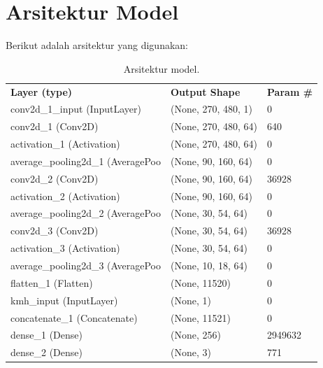 \section{Arsitektur Model}
\label{sec:arsitektur_model}

Berikut adalah arsitektur yang digunakan:

\begin{table}[H]
	\begin{tabular}{lll}
		\textbf{Layer (type)}                      & \textbf{Output Shape}         & \textbf{Param \#} \\
		conv2d\_1\_input (InputLayer)     & (None, 270, 480, 1)  & 0        \\
		conv2d\_1 (Conv2D)                & (None, 270, 480, 64) & 640      \\
		activation\_1 (Activation)        & (None, 270, 480, 64) & 0        \\
		average\_pooling2d\_1 (AveragePoo & (None, 90, 160, 64)  & 0        \\
		conv2d\_2 (Conv2D)                & (None, 90, 160, 64)  & 36928    \\
		activation\_2 (Activation)        & (None, 90, 160, 64)  & 0        \\
		average\_pooling2d\_2 (AveragePoo & (None, 30, 54, 64)   & 0        \\
		conv2d\_3 (Conv2D)                & (None, 30, 54, 64)   & 36928    \\
		activation\_3 (Activation)        & (None, 30, 54, 64)   & 0        \\
		average\_pooling2d\_3 (AveragePoo & (None, 10, 18, 64)   & 0        \\
		flatten\_1 (Flatten)              & (None, 11520)        & 0        \\
		kmh\_input (InputLayer)           & (None, 1)            & 0        \\
		concatenate\_1 (Concatenate)      & (None, 11521)        & 0        \\
		dense\_1 (Dense)                  & (None, 256)          & 2949632  \\
		dense\_2 (Dense)                  & (None, 3)            & 771     
	\end{tabular}
\caption{Arsitektur model.}
\label{tb:arsitektur_model}
\end{table}


